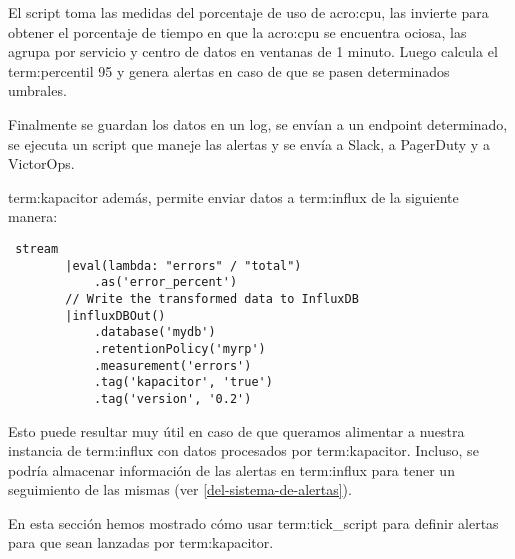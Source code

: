 El script toma las medidas del porcentaje de uso de \gls{acro:cpu}, las
invierte para obtener el porcentaje de tiempo en que la \gls{acro:cpu} se
encuentra ociosa, las agrupa por servicio y centro de datos en ventanas de 1
minuto. Luego calcula el \gls{term:percentil} 95 y genera alertas en caso de
que se pasen determinados umbrales.

Finalmente se guardan los datos en un log, se envían a un endpoint determinado,
se ejecuta un script que maneje las alertas y se envía a Slack, a PagerDuty y a
VictorOps.

\gls{term:kapacitor} además, permite enviar datos a \gls{term:influx} de la
siguiente manera:

\begin{lstlisting}
 stream
        |eval(lambda: "errors" / "total")
            .as('error_percent')
        // Write the transformed data to InfluxDB
        |influxDBOut()
            .database('mydb')
            .retentionPolicy('myrp')
            .measurement('errors')
            .tag('kapacitor', 'true')
            .tag('version', '0.2')
\end{lstlisting}


Esto puede resultar muy útil en caso de que queramos alimentar a nuestra
instancia de \gls{term:influx} con datos procesados por \gls{term:kapacitor}.
Incluso, se podría almacenar información de las alertas en \gls{term:influx}
para tener un seguimiento de las mismas (ver \autoref{del-sistema-de-alertas}).

En esta sección hemos mostrado cómo usar \gls{term:tick_script} para definir
alertas para que sean lanzadas por \gls{term:kapacitor}.
